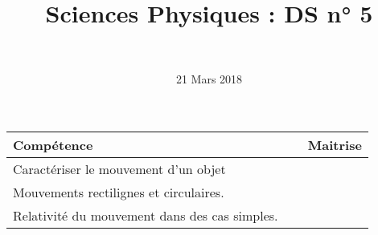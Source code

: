 \documentclass[a4paper,11pt]{exam}
\author{\ }
\date{21 Mars 2018}
\title{Sciences Physiques : DS n° 5}
\begin{document}
%	


	\maketitle


\begin{small}
	\begin{center}
		\begin{tabular}{|@{\ }l@{}|@{\ }c@{\ }|}
			\hline
			\textbf{Compétence} & \textbf{Maitrise} \\
			\hline
			Caractériser le mouvement d’un objet \ \ &  \ \ \ \\
			\hline
			Mouvements rectilignes et circulaires. &  \\
			\hline			
			Relativité du mouvement dans des cas simples.  \ \  &  \\
			\hline
			
		\end{tabular}
	\end{center}
\end{small}	
\vspace*{-0.5cm}	









\newpage 





\newpage




\ \label{LastPage}
\end{document}

